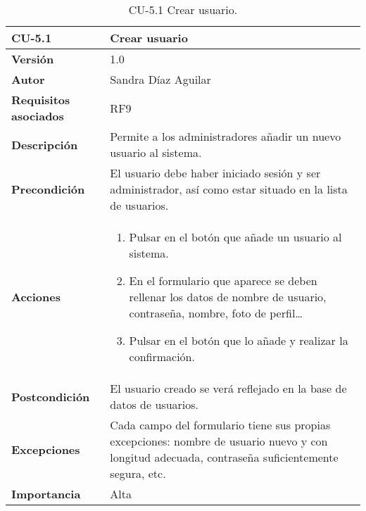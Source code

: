 \begin{table}[p]
	\centering
	\begin{tabularx}{\linewidth}{ p{} p{} }
		\toprule
		\textbf{CU-5.1}    & \textbf{Crear usuario}\\
		\toprule
		\textbf{Versión}              & 1.0    \\
		\textbf{Autor}                & Sandra Díaz Aguilar \\
		\textbf{Requisitos asociados} & RF9 \\
		\textbf{Descripción}          & Permite a los administradores añadir un nuevo usuario al sistema.  \\
		\textbf{Precondición}         & El usuario debe haber iniciado sesión y ser administrador, así como estar situado en la lista de usuarios. \\
		\textbf{Acciones}             &
		\begin{enumerate}
			\def\labelenumi{\arabic{enumi}.}
			\tightlist
			\item Pulsar en el botón que añade un usuario al sistema. 
			\item En el formulario que aparece se deben rellenar los datos de nombre de usuario, contraseña, nombre, foto de perfil\ldots 
            \item Pulsar en el botón que lo añade y realizar la confirmación. 
		\end{enumerate}\\
		\textbf{Postcondición}        & El usuario creado se verá reflejado en la base de datos de usuarios. \\
		\textbf{Excepciones}          & Cada campo del formulario tiene sus propias excepciones: nombre de usuario nuevo y con longitud adecuada, contraseña suficientemente segura, etc. \\
		\textbf{Importancia}          & Alta \\
		\bottomrule
	\end{tabularx}
	\caption{CU-5.1 Crear usuario.}
\end{table}


